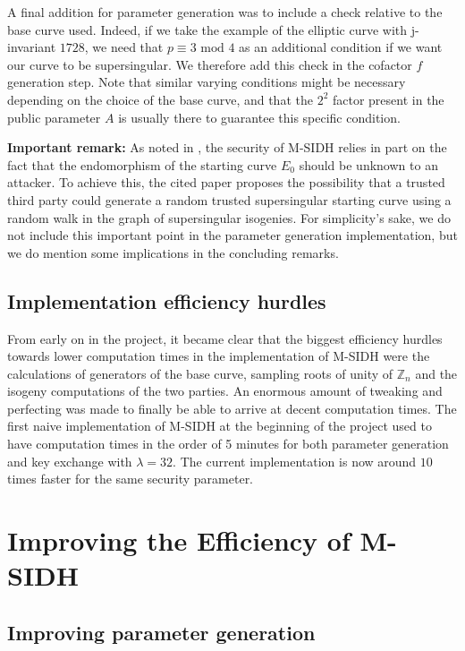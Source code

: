 \documentclass[a4paper,11pt,oneside]{report}
\newcommand{\zn}{$\mathbb{Z}_n$\xspace}
\begin{document}
    A final addition for parameter generation was to include a check relative to the base curve used. Indeed, if we take the example of the elliptic curve with j-invariant $1728$, we need that $p \equiv 3 \textrm{ mod } 4$ as an additional condition if we want our curve to be supersingular. We therefore add this check in the cofactor $f$ generation step. Note that similar varying conditions might be necessary depending on the choice of the base curve, and that the $2^2$ factor present in the public parameter $A$ is usually there to guarantee this specific condition.

    \textbf{Important remark:}
    \label{endo_remark}
    As noted in \cite{msidh}, the security of M-SIDH relies in part on the fact that the endomorphism of the starting curve $E_0$ should be unknown to an attacker. To achieve this, the cited paper proposes the possibility that a trusted third party could generate a random trusted supersingular starting curve using a random walk in the graph of supersingular isogenies. For simplicity's sake, we do not include this important point in the parameter generation implementation, but we do mention some implications in the concluding remarks.

    \subsection{Implementation efficiency hurdles}

    From early on in the project, it became clear that the biggest efficiency hurdles towards lower computation times in the implementation of M-SIDH were the calculations of generators of the base curve, sampling roots of unity of \zn and the isogeny computations of the two parties. An enormous amount of tweaking and perfecting was made to finally be able to arrive at decent computation times. The first naive implementation of M-SIDH at the beginning of the project used to have computation times in the order of 5 minutes for both parameter generation and key exchange with $\lambda = 32$. The current implementation is now around $10$ times faster for the same security parameter.

\section{Improving the Efficiency of M-SIDH}

    \subsection{Improving parameter generation}
\end{document}
